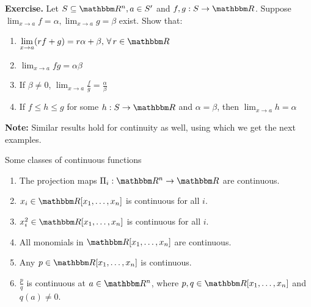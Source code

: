 \documentclass[Analysis-3]{subfiles}
\begin{document}
\textbf{Exercise.} Let $ S \subseteq \R^n, a \in S' $ and $ f,g: S \to \R $. Suppose $ \displaystyle \lim_{x \to a}f = \alpha, \lim_{x \to a}g = \beta $ exist. Show that:
\begin{enumerate}[label = (\roman*)]
  \item $ \displaystyle \lim_{x \to a}(rf+g) = r\alpha + \beta, \, \forall \, r \in \R $
  \item $ \lim_{x \to a}fg = \alpha \beta $
  \item If $ \beta \neq 0 $, $ \displaystyle \lim_{x \to a} \frac{f}{g} = \frac{\alpha}{\beta} $
  \item If $ f \leq h \leq g $ for some $ h: S \to \R $ and $ \alpha = \beta $, then $ \displaystyle \lim_{x \to a}h = \alpha $
\end{enumerate}
\textbf{Note:} Similar results hold for continuity as well, using which we get the next examples.
\msk

\begin{Eg}{Some classes of continuous functions}{}
  \begin{enumerate}[label = (\arabic*)]
    \item The projection maps $ \Pi_i : \R^n \to \R $ are continuous.
    \item $ x_i \in \R[x_1, \dots, x_n] $ is continuous for all $ i $.
    \item $ x_i^2 \in \R[x_1, \dots, x_n] $ is continuous for all $ i $.
    \item All monomials in $ \R[x_1, \dots, x_n] $ are continuous.
    \item Any $ p \in \R[x_1, \dots, x_n] $ is continuous.
    \item $ \frac{p}{q} $ is continuous at $ a \in \R^n $, where $ p,q \in \R[x_1, \dots, x_n] $ and $ q(a) \neq 0 $.
  \end{enumerate}
\end{Eg}
\end{document}
